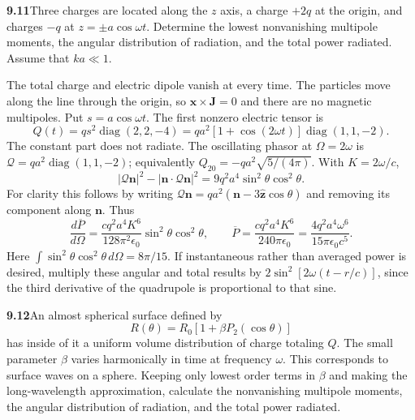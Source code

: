\par\bigskip
\noindent\textbf{9.11}\quad Three charges are located along the $z$ axis, a charge $+2q$ at the origin, and charges $-q$ at $z=\pm a\cos\omega t$. Determine the lowest nonvanishing multipole moments, the angular distribution of radiation, and the total power radiated. Assume that $ka\ll1$.
\solution

The total charge and electric dipole vanish at every time. The particles
move along the line through the origin, so $\mathbf x\times\mathbf J=0$
and there are no magnetic multipoles. Put $s=a\cos\omega t$. The first
nonzero electric tensor is
\[
Q(t)=qs^2\operatorname{diag}(2,2,-4)
=qa^2[1+\cos(2\omega t)]\operatorname{diag}(1,1,-2).
\]
The constant part does not radiate. The oscillating phasor at
$\Omega=2\omega$ is $\mathcal Q=qa^2\operatorname{diag}(1,1,-2)$;
equivalently $Q_{20}=-qa^2\sqrt{5/(4\pi)}$. With $K=2\omega/c$,
\[
|\mathcal Q\mathbf n|^2-|\mathbf n\cdot\mathcal Q\mathbf n|^2
=9q^2a^4\sin^2\theta\cos^2\theta.
\]
For clarity this follows by writing
$\mathcal Q\mathbf n=qa^2(\mathbf n-3\hat{\mathbf z}\cos\theta)$
and removing its component along $\mathbf n$. Thus
\[
\boxed{\frac{d\overline P}{d\Omega}
=\frac{cq^2a^4K^6}{128\pi^2\epsilon_0}\sin^2\theta\cos^2\theta,
\qquad
\overline P=\frac{cq^2a^4K^6}{240\pi\epsilon_0}
=\frac{4q^2a^4\omega^6}{15\pi\epsilon_0c^5}.}
\]
Here $\int\sin^2\theta\cos^2\theta\,d\Omega=8\pi/15$.
If instantaneous rather than averaged power is desired, multiply these
angular and total results by $2\sin^2[2\omega(t-r/c)]$, since the third
derivative of the quadrupole is proportional to that sine.

\par\bigskip
\noindent\textbf{9.12}\quad An almost spherical surface defined by
\[
R(\theta)=R_{0}[1+\beta P_{2}(\cos\theta)]
\]
has inside of it a uniform volume distribution of charge totaling $Q$. The small parameter $\beta$ varies harmonically in time at frequency $\omega$. This corresponds to surface waves on a sphere. Keeping only lowest order terms in $\beta$ and making the long-wavelength approximation, calculate the nonvanishing multipole moments, the angular distribution of radiation, and the total power radiated. 
\solution

